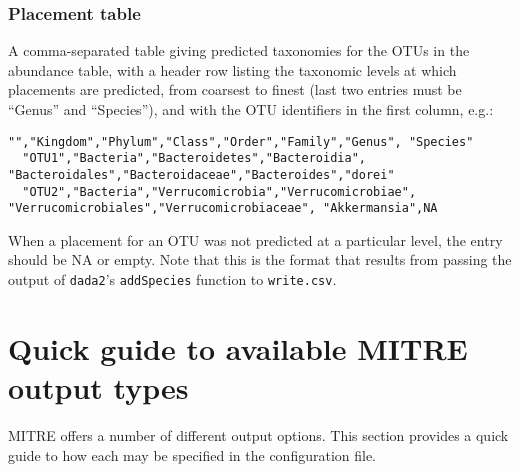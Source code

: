 \documentclass[12pt]{report}
\begin{document}
\subsection{Placement table}\label{placement_table}
A comma-separated table giving predicted taxonomies for the OTUs in
the abundance table, with a header row listing the taxonomic
levels at which placements are predicted, from coarsest to finest (last two entries must be ``Genus''
and ``Species''), and with the OTU identifiers in the first column, e.g.:
\begin{lstlisting}[caption=Example placement table]
  "","Kingdom","Phylum","Class","Order","Family","Genus", "Species"
  "OTU1","Bacteria","Bacteroidetes","Bacteroidia", "Bacteroidales","Bacteroidaceae","Bacteroides","dorei"
  "OTU2","Bacteria","Verrucomicrobia","Verrucomicrobiae", "Verrucomicrobiales","Verrucomicrobiaceae", "Akkermansia",NA
\end{lstlisting}
When a placement for an OTU was not predicted at a particular level,
the entry should be NA or empty.  Note that this is the format that
results from passing the output of \texttt{dada2}'s
\texttt{addSpecies} function to \texttt{write.csv}.

\chapter{Quick guide to available MITRE output types}
MITRE offers a number of different output options. This section
provides a quick guide to how each may be specified in the configuration
file.
\end{document}
